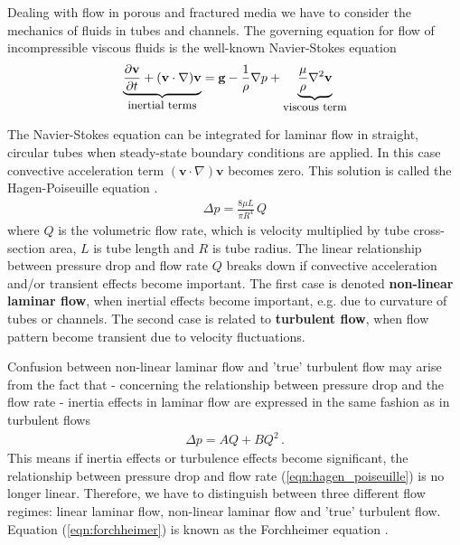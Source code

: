 Dealing with flow in porous and fractured media we have to
consider the mechanics of fluids in tubes and channels. The
governing equation for flow of incompressible viscous fluids is
the well-known Navier-Stokes equation
\begin{eqnarray}
\underbrace{
\frac{\partial{\mathbf{v}}}{\partial t}
+
({\mathbf{v}}\cdot\nabla){\mathbf{v}}
}_{\mbox{\small inertial terms}}
=
\mathbf{g}
-
\frac 1\rho \nabla p
+
\underbrace{
\frac{\mu}{\rho} \nabla^2 {\mathbf{v}}
}_{\mbox{\small viscous term}}
\label{eqn:navier_stokes_equations}
\end{eqnarray}

The Navier-Stokes equation can be integrated for laminar flow in
straight, circular tubes when steady-state boundary conditions are
applied. In this case
convective acceleration term
$({\mathbf{v}}\cdot\nabla){\mathbf{v}}$ becomes zero.
This solution is called the Hagen-Poiseuille equation \cite{Lamb:1932}.
\begin{eqnarray}
\Delta p
=
\frac{8\mu L}{\pi R^4} \, Q
\label{eqn:hagen_poiseuille}
\end{eqnarray}
where $Q$ is the volumetric flow rate, which is velocity
multiplied by tube cross-section area, $L$ is tube length and $R$
is tube radius. The linear relationship between pressure drop and
flow rate $Q$ breaks down if convective acceleration and/or
transient effects become important. The first case is denoted
\textbf{non-linear laminar flow},
when inertial effects become important, e.g. due to curvature of
tubes or channels. The second case is related to \textbf{turbulent
flow}, when flow pattern become transient
due to velocity fluctuations.

Confusion between
non-linear laminar flow and 'true' turbulent flow
may arise from the fact
that -
concerning the relationship between pressure drop and the flow rate -
inertia effects in laminar flow are expressed in the same fashion
as in turbulent flows
\begin{eqnarray}
\Delta p
=
A Q + B Q^2
\, .
\label{eqn:forchheimer}
\end{eqnarray}
This means if inertia effects or turbulence effects become
significant, the relationship between pressure drop and flow rate
(\ref{eqn:hagen_poiseuille}) is no longer linear. Therefore, we
have to distinguish between three different flow regimes: linear
laminar flow, non-linear laminar flow and 'true' turbulent flow.
Equation (\ref{eqn:forchheimer}) is known as the Forchheimer
equation \cite{For:14}.


